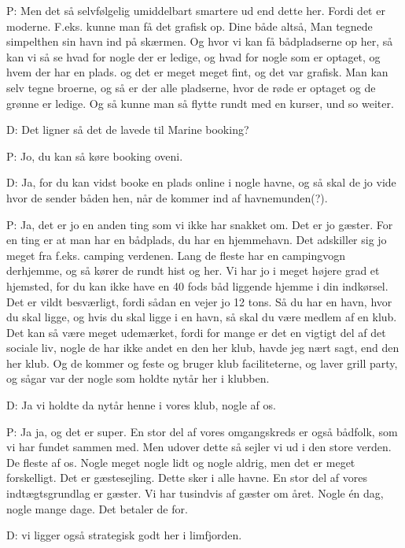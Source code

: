 

P: Men det så selvfølgelig umiddelbart smartere ud end dette her. Fordi det er moderne. F.eks. kunne man få det grafisk op. Dine både altså, Man tegnede simpelthen sin havn ind på skærmen. Og hvor vi kan få bådpladserne op her, så kan vi så se hvad for nogle der er ledige, og hvad for nogle som er optaget, og hvem der har en plads. og det er meget meget fint, og det var grafisk. Man kan selv tegne broerne, og så er der alle pladserne, hvor de røde er optaget og de grønne er ledige. Og så kunne man så flytte rundt med en kurser, und so weiter.

D: Det ligner så det de lavede til Marine booking?

P: Jo, du kan så køre booking oveni.

D: Ja, for du kan vidst booke en plads online i nogle havne, og så skal de jo vide hvor de sender båden hen, når de kommer ind af havnemunden(?).

P: Ja, det er jo en anden ting som vi ikke har snakket om. Det er jo gæster. For en ting er at man har en bådplads, du har en hjemmehavn. Det adskiller sig jo meget fra f.eks. camping verdenen. Lang de fleste har en campingvogn derhjemme, og så kører de rundt hist og her. Vi har jo i meget højere grad et hjemsted, for du kan ikke have en 40 fods båd liggende hjemme i din indkørsel. Det er vildt besværligt, fordi sådan en vejer jo 12 tons. Så du har en havn, hvor du skal ligge, og hvis du skal ligge i en havn, så skal du være medlem af en klub. Det kan så være meget udemærket, fordi for mange er det en vigtigt del af det sociale liv, nogle de har ikke andet en den her klub, havde jeg nært sagt, end den her klub. Og de kommer og feste og bruger klub faciliteterne, og laver grill party, og sågar var der nogle som holdte nytår her i klubben.

D: Ja vi holdte da nytår henne i vores klub, nogle af os.

P: Ja ja, og det er super. En stor del af vores omgangskreds er også bådfolk, som vi har fundet sammen med. Men udover dette så sejler vi ud i den store verden. De fleste af os. Nogle meget nogle lidt og nogle aldrig, men det er meget forskelligt. Det er gæstesejling. Dette sker i alle havne. En stor del af vores indtægtsgrundlag er gæster. Vi har tusindvis af gæster om året. Nogle én dag, nogle mange dage. Det betaler de for.

D: vi ligger også strategisk godt her i limfjorden.

